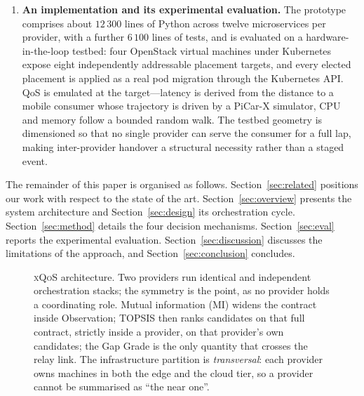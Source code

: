 \documentclass[conference]{IEEEtran}
\begin{document}
\begin{enumerate}
    \item \textbf{An implementation and its experimental evaluation.} The
    prototype comprises about $12\,300$ lines of Python across twelve
    microservices per provider, with a further $6\,100$ lines of tests, and is
    evaluated on a hardware-in-the-loop testbed: four OpenStack virtual
    machines under Kubernetes expose eight independently addressable placement
    targets, and every elected placement is applied as a real pod migration
    through the Kubernetes API. QoS is emulated at the target---latency is
    derived from the distance to a mobile consumer whose trajectory is driven
    by a PiCar-X simulator, CPU and memory follow a bounded random walk. The
    testbed geometry is dimensioned so that no single provider can serve the
    consumer for a full lap, making inter-provider handover a structural
    necessity rather than a staged event.
\end{enumerate}

The remainder of this paper is organised as follows.
Section~\ref{sec:related} positions our work with respect to the state of the
art. Section~\ref{sec:overview} presents the system architecture and
Section~\ref{sec:design} its orchestration cycle.
Section~\ref{sec:method} details the four decision mechanisms.
Section~\ref{sec:eval} reports the experimental evaluation.
Section~\ref{sec:discussion} discusses the limitations of the approach, and
Section~\ref{sec:conclusion} concludes.

\begin{figure}[!t]
\centering
\resizebox{0.94\textwidth}{!}{}
\caption{\textsc{xQoS} architecture. Two providers run identical and
independent orchestration stacks; the symmetry is the point, as no provider
holds a coordinating role. Mutual information (MI) widens the contract inside
Observation; TOPSIS then ranks candidates on that full contract, strictly
inside a provider, on that provider's own candidates; the Gap Grade is the
only quantity that crosses the relay link. The infrastructure partition is
\emph{transversal}: each provider owns machines in both the edge and the
cloud tier, so a provider cannot be summarised as ``the near one''.}
\label{fig:architecture}
\end{figure}
\end{document}

